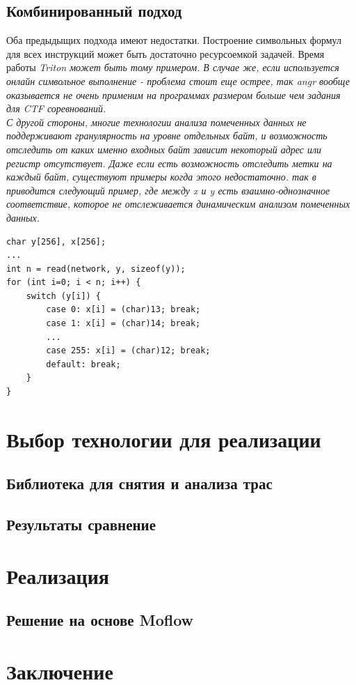 \section{Комбинированный подход}

Оба предыдыщих подхода имеют недостатки. Построение символьных формул для всех инструкций может быть достаточно ресурсоемкой задачей. Время работы \em{Triton} может быть тому примером. В случае же, если используется онлайн символьное выполнение - проблема стоит еще острее, так \em{angr} вообще оказывается не очень применим на программах размером больше чем задания для CTF соревнований.
\\
С другой стороны, многие технологии анализа помеченных данных не поддерживают гранулярность на уровне отдельных байт, и возможность отследить от каких именно входных байт зависит некоторый адрес или регистр отсутствует. Даже если есть возможность отследить метки на каждый байт, существуют примеры когда этого недостаточно. так в \cite{Cavallaro07anti-taint-analysis:practical} приводится следующий пример, где между x и y есть взаимно-однозначное соответствие, которое не отслеживается динамическим анализом помеченных данных.
\\

\begin{lstlisting}[environoment=C_LANG]
char y[256], x[256];
...
int n = read(network, y, sizeof(y));
for (int i=0; i < n; i++) {
    switch (y[i]) {
        case 0: x[i] = (char)13; break;
        case 1: x[i] = (char)14; break;
        ...
        case 255: x[i] = (char)12; break;
        default: break;
    }
}
\end{lstlisting}

\chapter{Выбор технологии для реализации}

\section{Библиотека для снятия и анализа трас}

\section{Результаты сравнение}


\chapter{Реализация}


\section{Решение на основе Moflow}

\chapter{Заключение}




